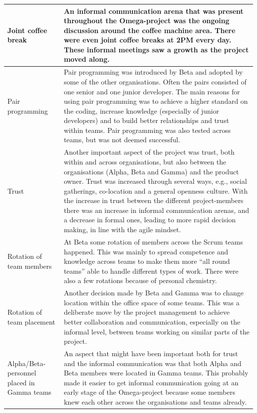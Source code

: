 \begin{center}
\begin{longtable}{| p{3.5cm} | p{8cm} |}
    Joint coffee break & An informal communication arena that was present throughout the Omega-project was the ongoing discussion around the coffee machine area. There were even joint coffee breaks at 2PM every day. These informal meetings saw a growth as the project moved along. \\ \hline
    Pair programming & Pair programming was introduced by Beta and adopted by some of the other organisations. Often the pairs consisted of one senior and one junior developer. The main reasons for using pair programming was to achieve a higher standard on the coding, increase knowledge (especially of junior developers) and to build better relationships and trust within teams. Pair programming was also tested across teams, but was not deemed successful. \\ \hline
    Trust & Another important aspect of the project was trust, both within and across organisations, but also between the organisations (Alpha, Beta and Gamma) and the product owner. Trust was increased through several ways, e.g., social gatherings, co-location and a general openness culture. With the increase in trust between the different project-members there was an increase in informal communication arenas, and a decrease in formal ones, leading to more rapid decision making, in line with the agile mindset. \\ \hline
    Rotation of team members & At Beta some rotation of members across the Scrum teams happened. This was mainly to spread competence and knowledge across teams to make them more ``all round teams'' able to handle different types of work. There were also a few rotations because of personal chemistry. \\ \hline
    Rotation of team placement & Another decision made by Beta and Gamma was to change location within the office space of some teams. This was a deliberate move by the project management to achieve better collaboration and communication, especially on the informal level, between teams working on similar parts of the project. \\ \hline
    Alpha/Beta-personnel placed in Gamma teams & An aspect that might have been important both for trust and the informal communication was that both Alpha and Beta members were located in Gamma teams. This probably made it easier to get informal communication going at an early stage of the Omega-project because some members knew each other across the organisations and teams already. \\ \hline

\end{longtable}
\end{center}
